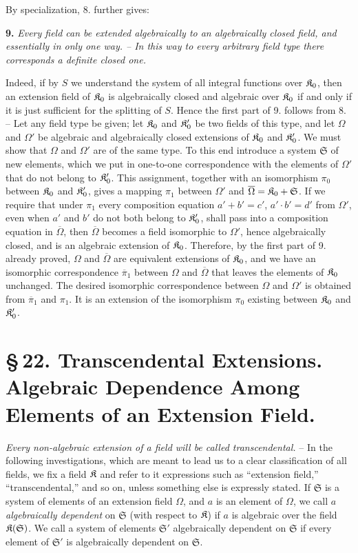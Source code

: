By specialization, 8. further gives:

\textbf{9.} \emph{Every field can be extended algebraically to an algebraically closed field, and essentially in only one way. -- In this way to every arbitrary field type there corresponds a definite closed one.}

Indeed, if by $S$ we understand the system of all integral functions over $\mathfrak K_0$, then an extension field of $\mathfrak K_0$ is algebraically closed and algebraic over $\mathfrak K_0$ if and only if it is just sufficient for the splitting of $S$. Hence the first part of 9. follows from 8. -- Let any field type be given; let $\mathfrak K_0$ and $\mathfrak K_0'$ be two fields of this type, and let $\Omega$ and $\Omega'$ be algebraic and algebraically closed extensions of $\mathfrak K_0$ and $\mathfrak K_0'$. We must show that $\Omega$ and $\Omega'$ are of the same type. To this end introduce a system $\mathfrak S$ of new elements, which we put in one-to-one correspondence with the elements of $\Omega'$ that do not belong to $\mathfrak K_0'$. This assignment, together with an isomorphism $\pi_0$ between $\mathfrak K_0$ and $\mathfrak K_0'$, gives a mapping $\pi_1$ between $\Omega'$ and $\overline\Omega=\mathfrak K_0+\mathfrak S$. If we require that under $\pi_1$ every composition equation $a'+b'=c'$, $a'\cdot b'=d'$ from $\Omega'$, even when $a'$ and $b'$ do not both belong to $\mathfrak K_0'$, shall pass into a composition equation in $\overline\Omega$, then $\overline\Omega$ becomes a field isomorphic to $\Omega'$, hence algebraically closed, and is an algebraic extension of $\mathfrak K_0$. Therefore, by the first part of 9. already proved, $\Omega$ and $\overline\Omega$ are equivalent extensions of $\mathfrak K_0$, and we have an isomorphic correspondence $\overline\pi_1$ between $\Omega$ and $\overline\Omega$ that leaves the elements of $\mathfrak K_0$ unchanged. The desired isomorphic correspondence between $\Omega$ and $\Omega'$ is obtained from $\overline\pi_1$ and $\pi_1$. It is an extension of the isomorphism $\pi_0$ existing between $\mathfrak K_0$ and $\mathfrak K_0'$.

\section*{\S\,22. Transcendental Extensions. Algebraic Dependence Among Elements of an Extension Field.}

\emph{Every non-algebraic extension of a field will be called transcendental.} -- In the following investigations, which are meant to lead us to a clear classification of all fields, we fix a field $\mathfrak K$ and refer to it expressions such as ``extension field,'' ``transcendental,'' and so on, unless something else is expressly stated. If $\mathfrak S$ is a system of elements of an extension field $\Omega$, and $a$ is an element of $\Omega$, we call $a$ \emph{algebraically dependent} on $\mathfrak S$ (with respect to $\mathfrak K$) if $a$ is algebraic over the field $\mathfrak K(\mathfrak S)$. We call a system of elements $\mathfrak S'$ algebraically dependent on $\mathfrak S$ if every element of $\mathfrak S'$ is algebraically dependent on $\mathfrak S$.


